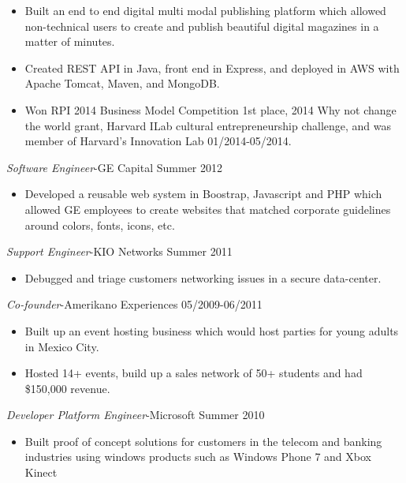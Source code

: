 \documentclass[line,margin]{res}
\begin{document}
\begin{resume}
\begin{itemize}  \itemsep -4pt
\item Built an end to end digital multi modal publishing platform which allowed non-technical users to create and publish beautiful digital magazines in a matter of minutes.
\item Created REST API in Java, front end in Express, and deployed in AWS with Apache Tomcat, Maven, and MongoDB.
\item Won RPI 2014 Business Model Competition 1st place, 2014 Why not change the world grant, Harvard ILab cultural entrepreneurship challenge, and was member of Harvard's Innovation Lab 01/2014-05/2014.
\end{itemize}
{\sl Software Engineer}-GE Capital \hfill Summer 2012
\begin{itemize}  \itemsep -4pt
\item Developed a reusable web system in Boostrap, Javascript and PHP which allowed GE employees to create websites that matched corporate guidelines around colors, fonts, icons, etc.
\end{itemize}
{\sl Support Engineer}-KIO Networks \hfill Summer 2011
\begin{itemize}  \itemsep -4pt
\item Debugged and triage customers networking issues in a secure data-center.
\end{itemize}
{\sl Co-founder}-Amerikano Experiences \hfill 05/2009-06/2011
\begin{itemize}  \itemsep -4pt
\item Built up an event hosting business which would host parties for young adults in Mexico City.
\item Hosted 14+ events, build up a sales network of 50+ students and had \$150,000 revenue.
\end{itemize}
{\sl Developer Platform Engineer}-Microsoft \hfill Summer 2010
\begin{itemize}  \itemsep -4pt
\item Built proof of concept solutions for customers in the telecom and banking industries using windows products such as Windows Phone 7 and Xbox Kinect
\end{itemize}
\end{resume}
\end{document}
